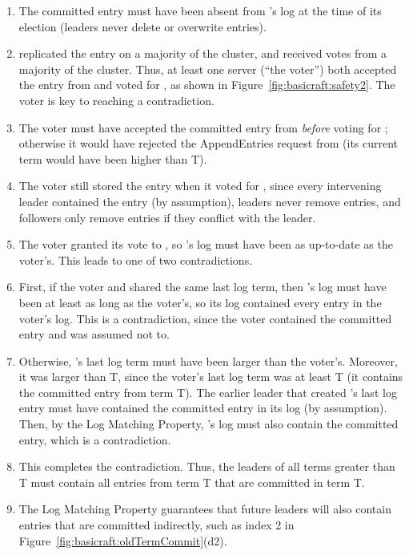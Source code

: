 \begin{enumerate}

\item The committed entry must have been absent from \leaderU{}'s log
at the time of its election (leaders never delete or overwrite entries).

\item \leaderT{} replicated the entry on a majority of the
cluster, and \leaderU{} received votes from a majority of
the cluster. Thus, at least one server (``the voter'') both accepted
the entry from \leaderT{} and voted for \leaderU{}, as shown
in Figure~\ref{fig:basicraft:safety2}. The voter is key to reaching a
contradiction.

\item  The voter must have accepted the committed entry from \leaderT{}
\emph{before} voting for \leaderU{}; otherwise it would have rejected
the AppendEntries request from \leaderT{} (its current term would
have been higher than T).

\item The voter still stored the entry when it voted for
\leaderU{}, since every intervening leader contained
the entry (by assumption), leaders never remove entries, and followers
only remove entries if they conflict with the leader.

\item The voter granted its vote to \leaderU{}, so \leaderU{}'s log must
have been as up-to-date as the voter's. This leads to one of two
contradictions.

\item First, if the voter and \leaderU{} shared the same last log term,
then \leaderU{}'s log must have been at least as long as the voter's,
so its log contained every entry in the voter's log. This is a contradiction,
since the voter contained the committed entry and \leaderU{} was assumed
not to.

\item Otherwise, \leaderU{}'s last log term must have been larger than
the voter's.
Moreover, it was larger than T, since the voter's last log term was at
least T (it contains the committed entry from term T). The earlier
leader that created \leaderU{}'s last log entry must have contained
the committed entry in its log (by assumption).
Then, by the Log Matching Property, \leaderU{}'s log must also contain
the committed entry, which is a contradiction.

\item This completes the contradiction. Thus, the leaders of all terms
greater than T must contain all entries from term T that are committed
in term T.

\item The Log Matching Property guarantees that future leaders
will also contain entries that are committed indirectly, such as
index 2 in Figure~\ref{fig:basicraft:oldTermCommit}(d2).

\end{enumerate}

